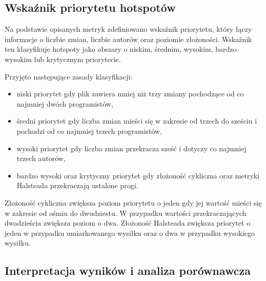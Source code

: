 \subsection{Wskaźnik priorytetu hotspotów}

Na podstawie opisanych metryk zdefiniowano wskaźnik priorytetu, który łączy informacje o liczbie zmian, liczbie autorów oraz poziomie złożoności. Wskaźnik ten klasyfikuje hotspoty jako obszary o niskim, średnim, wysokim, bardzo wysokim lub krytycznym priorytecie.  

Przyjęto następujące zasady klasyfikacji:

\begin{itemize}
\item niski priorytet gdy plik zawiera mniej niż trzy zmiany pochodzące od co najmniej dwóch programistów,
\item średni priorytet gdy liczba zmian mieści się w zakresie od trzech do sześciu i pochodzi od co najmniej trzech programistów,
\item wysoki priorytet gdy liczba zmian przekracza sześć i dotyczy co najmniej trzech autorów,
\item bardzo wysoki oraz krytyczny priorytet gdy złożoność cykliczna oraz metryki Halsteada przekraczają ustalone progi.
\end{itemize}

Złożoność cykliczna zwiększa poziom priorytetu o jeden gdy jej wartość mieści się w zakresie od ośmiu do dwudziestu. W przypadku wartości przekraczających dwadzieścia zwiększa poziom o dwa. Złożoność Halsteada zwiększa priorytet o jeden w przypadku umiarkowanego wysiłku oraz o dwa w przypadku wysokiego wysiłku.

\subsection*{Interpretacja wyników i analiza porównawcza}

